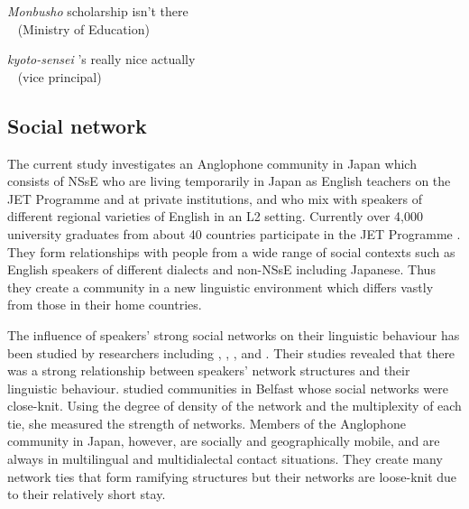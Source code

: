 \documentclass[output=paper]{LSP/langsci}
\begin{document}

\ea
{} {\textit{Monbusho}} {scholarship isn't there}\\
{~} {(Ministry of Education)} {~}\\
\z


\ea
{} {\textit{kyoto-sensei}} {'s really nice actually}\\
{~} {(vice principal)} {~}\\
\z

\subsection{Social network}
The current study investigates an Anglophone community in Japan which consists of NSsE who are living temporarily in Japan as English teachers on the JET Programme and at private institutions, and who mix with speakers of different regional varieties of English in an L2 setting. Currently over 4,000 university graduates from about 40 countries participate in the JET Programme \citep{council_of_local_authorities_for_international_relations_[clair]_jet_2013}. They form relationships with people from a wide range of social contexts such as English speakers of different dialects and non-NSsE including Japanese. Thus they create a community in a new linguistic environment which differs vastly from those in their home countries.

The influence of speakers’ strong social networks on their linguistic behaviour has been studied by researchers including \citet{cheshire_variation_1982}, \citet{eckert_adolescent_1988}, \citet{hirano_dialect_2013}, \citet{labov_language_1972} and \citet{milroy_language_1987}. Their studies revealed that there was a strong relationship between speakers’ network structures and their linguistic behaviour. \citet{milroy_language_1987} studied communities in Belfast whose social networks were close-knit. Using the degree of density of the network and the multiplexity of each tie, she measured the strength of networks. Members of the Anglophone community in Japan, however, are socially and geographically mobile, and are always in multilingual and multidialectal contact situations. They create many network ties that form ramifying structures but their networks are loose-knit due to their relatively short stay.
\end{document}
